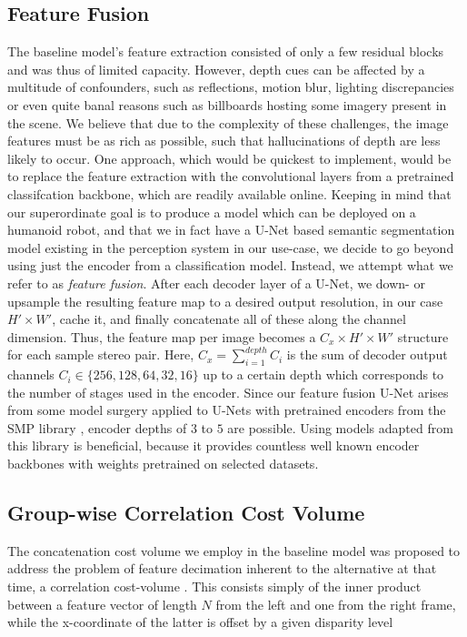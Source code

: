 \documentclass[runningheads]{llncs}
\begin{document}
\subsection{Feature Fusion}\label{Sec:Feature_Fusion}
The baseline model's feature extraction consisted of only a few residual blocks and was thus of limited capacity. However, depth cues can be affected by a multitude of confounders, such as reflections, motion blur, lighting discrepancies or even quite banal reasons such as billboards hosting some imagery present in the scene. We believe that due to the complexity of these challenges, the image features must be as rich as possible, such that hallucinations of depth are less likely to occur. One approach, which would be quickest to implement, would be to replace the feature extraction with the convolutional layers from a pretrained classifcation backbone, which are readily available online. Keeping in mind that our superordinate goal is to produce a model which can be deployed on a humanoid robot, and that we in fact have a U-Net based semantic segmentation model existing in the perception system in our use-case, we decide to go beyond using just the encoder from a classification model. Instead, we attempt what we refer to as \textit{feature fusion}. After each decoder layer of a U-Net, we down- or upsample the resulting feature map to a desired output resolution, in our case $H' \times W'$, cache it, and finally concatenate all of these along the channel dimension. Thus, the feature map per image becomes a $C_x \times H' \times W'$ structure for each sample stereo pair. Here, $C_x=\sum_{i=1}^{depth}C_i$ is the sum of decoder output channels $C_i \in \{256, 128, 64, 32, 16\}$ up to a certain depth which corresponds to the number of stages used in the encoder. Since our feature fusion U-Net arises from some model surgery applied to U-Nets with pretrained encoders from the SMP library \cite{SMP}, encoder depths of $3$ to $5$ are possible. Using models adapted from this library is beneficial, because it provides countless well known encoder backbones with weights pretrained on selected datasets.
\subsection{Group-wise Correlation Cost Volume}\label{Sec:Gwc}
The concatenation cost volume we employ in the baseline model was proposed to address the problem of feature decimation inherent to the alternative at that time, a correlation cost-volume \cite{Cost_Volume}. This consists simply of the inner product between a feature vector of length $N$ from the left and one from the right frame, while the x-coordinate of the latter is offset by a given disparity level
\end{document}
